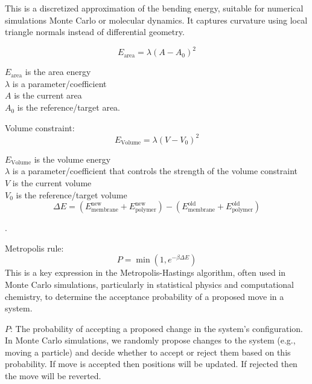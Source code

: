 \documentclass[12pt]{article}
\begin{document}
\begin{flushleft}
This is a discretized approximation of the bending energy, suitable for numerical simulations Monte Carlo or molecular dynamics. It captures curvature using local triangle normals instead of differential geometry.


\begin{equation}
E_{\text{area}} = \lambda(A - A_0)^2
\end{equation}

$E_{\text{area}}$ is the area energy\\
$\lambda$ is a parameter/coefficient\\
$A$ is the current area\\
$A_0$ is the reference/target area.



Volume constraint:
\begin{equation}
E_{\text{Volume}} = \lambda(V - V_0)^2
\end{equation}

$E_{\text{Volume}}$ is the volume energy\\
$\lambda$ is a parameter/coefficient that controls the strength of the volume constraint\\
$V$ is the current volume\\
$V_0$ is the reference/target volume\\



\begin{equation}
\Delta E = (E_{\text{membrane}}^{\text{new}} + E_{\text{polymer}}^{\text{new}}) - (E_{\text{membrane}}^{\text{old}} + E_{\text{polymer}}^{\text{old}})
\end{equation}






.


Metropolis rule:
\begin{equation}
P = \min\left(1, e^{-\beta \Delta E}\right)
\end{equation}
This is a key expression in the Metropolis-Hastings algorithm, often used in Monte Carlo simulations, particularly in statistical physics and computational chemistry, to determine the acceptance probability of a proposed move in a system.


 $P$: The probability of accepting a proposed change in the system's configuration. In Monte Carlo simulations, we randomly propose changes to the system (e.g., moving a particle) and decide whether to accept or reject them based on this probability. If move is accepted then positions will be updated. If rejected then the move will be reverted.


\end{flushleft}
\end{document}
